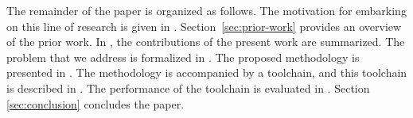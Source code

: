 The remainder of the paper is organized as follows. The motivation for embarking
on this line of research is given in .
Section~\ref{sec:prior-work} provides an overview of the prior work. In
, the contributions of the present work are summarized. The
problem that we address is formalized in . The
proposed methodology is presented in . The methodology is
accompanied by a toolchain, and this toolchain is described in .
The performance of the toolchain is evaluated in .
Section \ref{sec:conclusion} concludes the paper.
